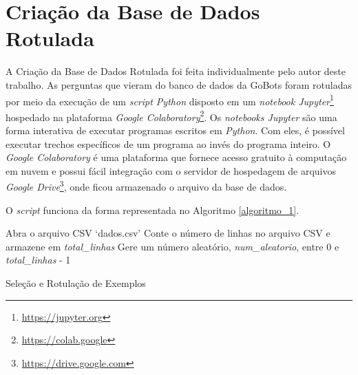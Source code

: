 \section{Criação da Base de Dados Rotulada}
\label{criacao_base_dados_rotulada}
A Criação da Base de Dados Rotulada foi feita individualmente pelo autor deste trabalho. As perguntas que vieram do banco de dados da GoBots foram rotuladas por meio da execução de um \textit{script Python} disposto em um \textit{notebook Jupyter}\footnote{\url{https://jupyter.org}} hospedado na plataforma \textit{Google Colaboratory}\footnote{\url{https://colab.google}}. Os \textit{notebooks Jupyter} são uma forma interativa de executar programas escritos em \textit{Python}. Com eles, é possível executar trechos específicos de um programa ao invés do programa inteiro. O \textit{Google Colaboratory} é uma plataforma que fornece acesso gratuito à computação em nuvem e possui fácil integração com o servidor de hospedagem de arquivos \textit{Google Drive}\footnote{\url{https://drive.google.com}}, onde ficou armazenado o arquivo da base de dados.

O \textit{script} funciona da forma representada no Algoritmo \ref{algoritmo_1}.


\begin{algorithm}[H]
\SetAlgoLined
\DontPrintSemicolon
{}
\BlankLine
Abra o arquivo CSV `dados.csv'\;
Conte o número de linhas no arquivo CSV e armazene em \textit{total\_linhas}\;
Gere um número aleatório, \textit{num\_aleatorio}, entre 0 e \textit{total\_linhas} - 1\;
\BlankLine
{}
\KwRet\;
\caption{Seleção e Rotulação de Exemplos}
\label{algoritmo_1}
\end{algorithm}

